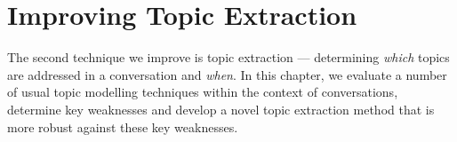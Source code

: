\chapter[Topic Extraction]{Improving Topic Extraction}
The second technique we improve is topic extraction --- determining \textit{which} topics are addressed in a conversation and \textit{when}. In this chapter, we evaluate a number of usual topic modelling techniques within the context of conversations, determine key weaknesses and develop a novel topic extraction method that is more robust against these key weaknesses.






\glsresetall